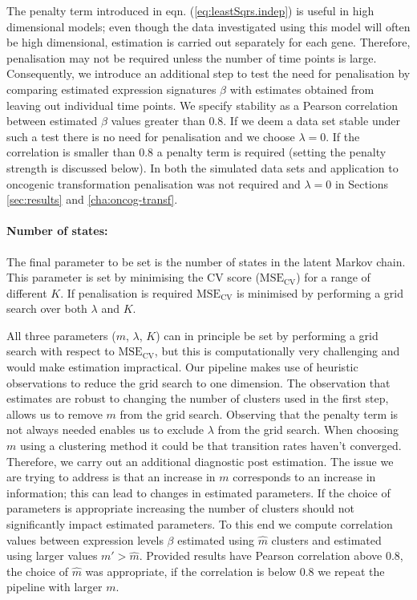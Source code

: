 The penalty term introduced in eqn. (\ref{eq:leastSqrs.indep}) is useful in high dimensional models; even though the data investigated using this model will often be high dimensional, estimation is carried out separately for each gene. Therefore, penalisation may not be required unless the number of time points is large. Consequently, we introduce an additional step to test the need for penalisation by comparing estimated expression signatures $\beta$ with estimates obtained from leaving out individual time points. We specify stability as a Pearson correlation between estimated $\beta$ values  greater than $0.8$. If we deem a data set stable under such a test there is no need for penalisation and we choose $\lambda=0$. If the correlation is smaller than $0.8$ a penalty term is required (setting the penalty strength is discussed below). In both the simulated data sets and application to oncogenic transformation penalisation was not required and $\lambda=0$ in Sections \ref{sec:results} and \ref{cha:oncog-transf}.

\paragraph{Number of states:}
\label{sec:number-states}

The final parameter to be set is the number of states in the latent Markov chain. This parameter is set by minimising the CV score ($\mathrm{MSE_{CV}}$) for a range of different $K$. If penalisation is required $\mathrm{MSE_{CV}}$ is minimised by performing a grid search over both $\lambda$ and $K$.

All three parameters ($m$, $\lambda$, $K$) can in principle be set by performing a grid search with respect to $\mathrm{MSE_{CV}}$, but this is computationally very challenging and would make estimation impractical. Our pipeline makes use of heuristic observations to reduce the grid search to one dimension. The observation that estimates are robust to changing the number of clusters used in the first step, allows us to remove $m$ from the grid search. Observing that the penalty term is not always needed enables us to exclude $\lambda$ from the grid search. When choosing $m$ using a clustering method it could be that transition rates haven't converged. Therefore, we carry out an additional diagnostic post estimation. The issue we are trying to address is that an increase in $m$ corresponds to an increase in information; this can lead to changes in estimated parameters. If the choice of parameters is appropriate increasing the number of clusters should not significantly impact estimated parameters. To this end we compute correlation values between expression levels $\beta$ estimated using $\hat{m}$ clusters and estimated using larger values $m' > \hat{m}$. Provided results have Pearson correlation above $0.8$, the choice of $\hat{m}$ was appropriate, if the correlation is below $0.8$ we repeat the pipeline with larger $m$.

